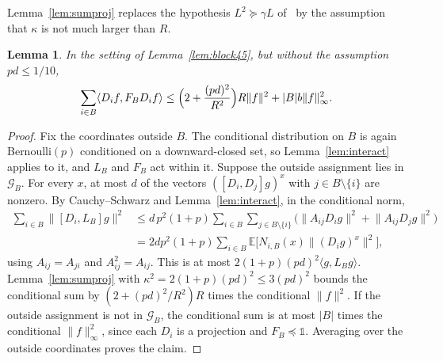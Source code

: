 \documentclass[11pt]{article}
\newtheorem{lemma}[theorem]{Lemma}
\theoremstyle{remark}
\newcommand{\E}{\mathbb{E}}
\newcommand{\Id}{\mathbb{1}}
\newcommand{\abs}[1]{\lvert #1\rvert}
\newcommand{\norm}[1]{\lVert #1\rVert}
\newcommand{\ip}[2]{\langle #1, #2\rangle}
\newcommand{\Ev}{\mathcal{G}}
\begin{document}
Lemma~\ref{lem:sumproj} replaces the hypothesis $L^2\succeq\gamma L$ of~\cite[Lemma~4.4]{CGZ26} by the assumption that $\kappa$ is not much larger than $R$.

\begin{lemma}\label{lem:block}
In the setting of Lemma~\ref{lem:block45}, but without the assumption $pd\le1/10$,
\[\sum_{i\in B}\ip{D_if}{F_BD_if}\le\Bigl(2+\frac{(pd)^2}{R^2}\Bigr)R\norm f^2+\abs Bb\norm f_\infty^2.\]
\end{lemma}

\begin{proof}
Fix the coordinates outside $B$. The conditional distribution on $B$ is again Bernoulli$(p)$ conditioned on a downward-closed set, so Lemma~\ref{lem:interact} applies to it, and $L_B$ and $F_B$ act within it. Suppose the outside assignment lies in $\Ev_B$. For every $x$, at most $d$ of the vectors $([D_i,D_j]g)^x$ with $j\in B\setminus\{i\}$ are nonzero. By Cauchy--Schwarz and Lemma~\ref{lem:interact}, in the conditional norm,
\begin{align*}\sum_{i\in B}\norm{[D_i,L_B]g}^2&\le d\,p^2(1+p)\sum_{i\in B}\sum_{j\in B\setminus\{i\}}\bigl(\norm{A_{ij}D_ig}^2+\norm{A_{ij}D_jg}^2\bigr)\\&=2dp^2(1+p)\sum_{i\in B}\E\bigl[N_{i,B}(x)\norm{(D_ig)^x}^2\bigr],\end{align*}
using $A_{ij}=A_{ji}$ and $A_{ij}^2=A_{ij}$. This is at most $2(1+p)(pd)^2\ip g{L_Bg}$. Lemma~\ref{lem:sumproj} with $\kappa^2=2(1+p)(pd)^2\le3(pd)^2$ bounds the conditional sum by $(2+(pd)^2/R^2)R$ times the conditional $\norm f^2$. If the outside assignment is not in $\Ev_B$, the conditional sum is at most $\abs B$ times the conditional $\norm f_\infty^2$, since each $D_i$ is a projection and $F_B\preceq\Id$. Averaging over the outside coordinates proves the claim.
\end{proof}
\end{document}
